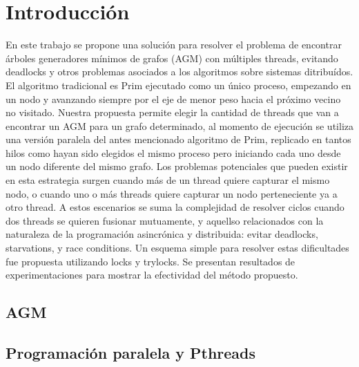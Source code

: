 \section{Introducción}
En este trabajo se propone una solución para resolver el problema de encontrar árboles generadores mínimos de grafos (AGM) con múltiples threads, evitando deadlocks y otros problemas asociados a los algoritmos sobre sistemas ditribuídos. El algoritmo tradicional es Prim ejecutado como un único proceso, empezando en un nodo y avanzando siempre por el eje de menor peso hacia el próximo vecino no visitado. Nuestra propuesta permite elegir la cantidad de threads que van a encontrar un AGM para un grafo determinado, al momento de ejecución se utiliza una versión paralela del antes mencionado algoritmo de Prim, replicado en tantos hilos como hayan sido elegidos el mismo proceso pero iniciando cada uno desde un nodo diferente del mismo grafo. Los problemas potenciales que pueden existir en esta estrategia surgen cuando más de un thread quiere capturar el mismo nodo, o cuando uno o más threads quiere capturar un nodo perteneciente ya a otro thread. A estos escenarios se suma la complejidad de resolver ciclos cuando dos threads se quieren fusionar mutuamente, y aquellso relacionados con la naturaleza de la programación asincrónica y distribuida: evitar deadlocks, starvations, y race conditions. Un esquema simple para resolver estas dificultades fue propuesta utilizando locks y trylocks. Se presentan resultados de experimentaciones para mostrar la efectividad del método propuesto.


\subsection{AGM}


\subsection{Programación paralela y Pthreads}
